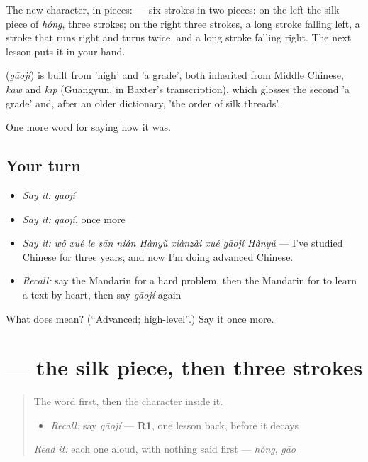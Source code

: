 The new character, in pieces:  — six strokes in two pieces: on the left the silk piece of  \emph{hóng}, three strokes; on the right three strokes, a long stroke falling left, a stroke that runs right and turns twice, and a long stroke falling right. The next lesson puts it in your hand.

\begin{cousinweb}
\textbf{} (\emph{gāojí}) is built from  'high' and  'a grade', both inherited from Middle Chinese, \emph{kaw} and \emph{kip} (Guangyun, in Baxter's transcription), which glosses the second 'a grade' and, after an older dictionary, 'the order of silk threads'.
\end{cousinweb}

\begin{grammarlens}[title={What you've built}]
One more word for saying how it was.
\end{grammarlens}

\subsection*{Your turn}
\begin{itemize}
\raggedright
  \item \emph{Say it:} \emph{gāojí}
  \item \emph{Say it:} \emph{gāojí}, once more
  \item \emph{Say it:} \emph{wǒ xué le sān nián Hànyǔ xiànzài xué gāojí Hànyǔ} — I've studied Chinese for three years, and now I'm doing advanced Chinese.
  \item \emph{Recall:} say the Mandarin for a hard problem, then the Mandarin for to learn a text by heart, then say \emph{gāojí} again
\end{itemize}

\begin{tcolorbox}[breakable,colback=teal!4,colframe=teal!35!black,title={Before you move on}]
What does  mean? (\textquotedblleft{}Advanced; high-level\textquotedblright{}.) Say it once more.
\end{tcolorbox}
\section[\texorpdfstring{\zh{级} (jí)}{级 (jí)}]{ — the silk piece, then three strokes}

\label{lesson:ZH-W496-ji-grade}



\begin{quote}
The word first, then the character inside it.

\begin{itemize}
\raggedright
  \item \emph{Recall:} say \emph{gāojí} — \textbf{R1}, one lesson back, before it decays
\end{itemize}

\begin{quote}
 
\end{quote}

\emph{Read it:} each one aloud, with nothing said first — \emph{hóng}, \emph{gāo}
\end{quote}

